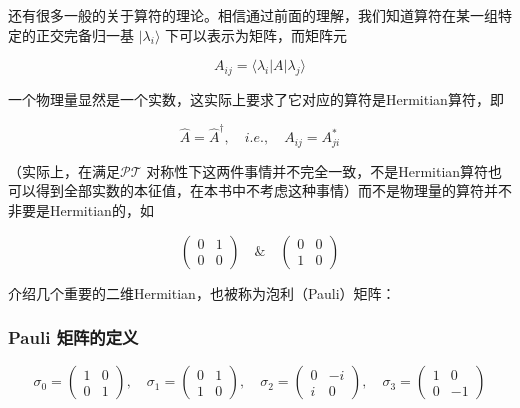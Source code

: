 还有很多一般的关于算符的理论。相信通过前面的理解，我们知道算符在某一组特定的正交完备归一基 $|\lambda_i\rangle$ 下可以表示为矩阵，而矩阵元

\begin{equation}
A_{ij} = \langle\lambda_i|A|\lambda_j\rangle
\end{equation}

一个物理量显然是一个实数，这实际上要求了它对应的算符是Hermitian算符，即

\begin{equation}
\hat{A} = \hat{A}^{\dagger},\quad i.e.,\quad A_{ij} = A_{ji}^*
\end{equation}

（实际上，在满足$\mathcal{PT}$ 对称性下这两件事情并不完全一致，不是Hermitian算符也可以得到全部实数的本征值，在本书中不考虑这种事情）而不是物理量的算符并不非要是Hermitian的，如

\begin{equation}
\left(\begin{matrix}0 & 1\\0 & 0\end{matrix}\right) \quad \& \quad \left(\begin{matrix}0 & 0\\1 & 0\end{matrix}\right)
\end{equation}

介绍几个重要的二维Hermitian，也被称为泡利（Pauli）矩阵：

\subsubsection{Pauli 矩阵的定义}

\begin{equation}
\sigma_0 = \left(\begin{matrix}1 & 0\\0 & 1\end{matrix}\right),
\quad\sigma_1 = \left(\begin{matrix} 0 & 1\\1 & 0\end{matrix}\right),
\quad\sigma_2 = \left(\begin{matrix} 0 & -i\\i & 0\end{matrix}\right),
\quad\sigma_3 = \left(\begin{matrix} 1 & 0\\0 & -1\end{matrix}\right)  
\end{equation}

